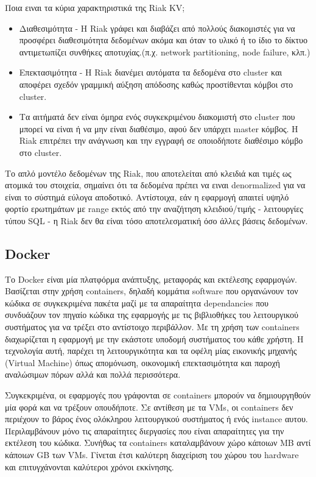 \documentclass[conference]{IEEEtran}
\begin{document}
Ποια ειναι τα κύρια χαρακτηριστικά της Riak KV;
\begin{itemize}
    \item 
    Διαθεσιμότητα - H Riak γράφει και διαβάζει από πολλούς διακομιστές για να προσφέρει διαθεσιμότητα δεδομένων ακόμα και όταν το υλικό ή το ίδιο το δίκτυο αντιμετωπίζει συνθήκες αποτυχίας.(π.χ. network partitioning, node failure, κλπ.)
    
    \item 
    Επεκτασιμότητα - Η Riak διανέμει αυτόματα τα δεδομένα στο cluster και αποφέρει σχεδόν γραμμική αύξηση απόδοσης καθώς προστίθενται κόμβοι στο cluster.

    \item 
    Τα αιτήματά δεν είναι όμηρα ενός συγκεκριμένου διακομιστή στο cluster που μπορεί να είναι ή να μην είναι διαθέσιμο, αφού δεν υπάρχει master κόμβος. Η Riak επιτρέπει την ανάγνωση και την εγγραφή σε οποιοδήποτε διαθέσιμο κόμβο στο cluster.
\end{itemize}
Το απλό μοντέλο δεδομένων της Riak, που αποτελείται από κλειδιά και τιμές ως ατομικά του στοιχεία, σημαίνει ότι τα δεδομένα πρέπει να ειναι denormalized για να είναι το σύστημά εύλογα αποδοτικό. Αντίστοιχα, εάν η εφαρμογή απαιτεί υψηλό φορτίο ερωτημάτων με range εκτός από την αναζήτηση κλειδιού/τιμής - λειτουργίες τύπου SQL - η Riak δεν θα είναι τόσο αποτελεσματική όσο άλλες βάσεις δεδομένων.



\subsection{Docker}
Το Docker είναι μία πλατφόρμα ανάπτυξης, μεταφοράς και εκτέλεσης εφαρμογών. Βασίζεται στην χρήση containers, δηλαδή κομμάτια software που οργανώνουν τον κώδικα σε συγκεκριμένα πακέτα μαζί με τα απαραίτητα dependancies που συνδυάζουν τον πηγαίο κώδικα της εφαρμογής με τις βιβλιοθήκες του λειτουργικού συστήματος για να τρέξει στο αντίστοιχο περιβάλλον.  Με τη χρήση των containers διαχωρίζεται η εφαρμογή με την εκάστοτε υποδομή συστήματος του κάθε χρήστη. Η τεχνολογία αυτή, παρέχει τη λειτουργικότητα και τα οφέλη μίας εικονικής μηχανής (Virtual Machine) όπως απομόνωση, οικονομική επεκτασιμότητα και παροχή αναλώσιμων πόρων αλλά και πολλά περισσότερα.

Συγκεκριμένα, οι εφαρμογές που γράφονται σε containers μπορούν να δημιουργηθούν μία φορά και να τρέξουν οπουδήποτε. Σε αντίθεση με τα VMs, οι containers δεν περιέχουν το βάρος ένος ολόκληρου λειτουργικού συστήματος ή ενός instance αυτου. Περιλαμβάνουν μόνο τις απαραίτητες διεργασίες που είναι απαραίτητες για την εκτέλεση του κώδικα. Συνήθως τα containers καταλαμβάνουν χώρο κάποιων MB αντί κάποιων GB των VMs. Γίνεται έτσι καλύτερη διαχείριση του χώρου του hardware και επιτυγχάνονται καλύτεροι χρόνοι εκκίνησης.
\end{document}

